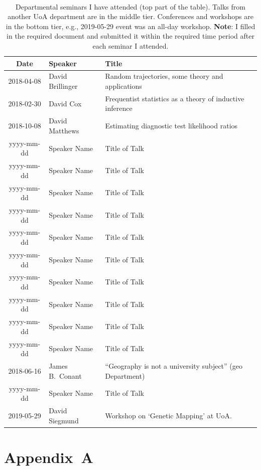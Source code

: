 \documentclass[12pt,a4paper]{article}
\begin{document}
\begin{table}[hh]
\caption{
Departmental seminars I have attended (top part of the table).
Talks from another UoA department are in the middle tier.
Conferences and workshops are in the bottom tier,
e.g., 2019-05-29 event was an all-day workshop.
\textbf{Note}:
I filled in the required document and submitted it
within the required time period after
each seminar I attended.
}
\centering
\ ~~~~ \\
\label{tab:seminars}
\begin{tabular}{|c|l|l|}
\hline
Date & Speaker & Title \\
\hline
2018-04-08 & David Brillinger &
Random trajectories, some theory and applications \\
%
2018-02-30 & David Cox &
Frequentist statistics as a theory of inductive inference \\
%
2018-10-08 & David Matthews &
Estimating diagnostic test likelihood ratios \\
%
yyyy-mm-dd & Speaker Name &
Title of Talk \\
%
yyyy-mm-dd & Speaker Name &
Title of Talk \\
%
yyyy-mm-dd & Speaker Name &
Title of Talk \\
%
yyyy-mm-dd & Speaker Name &
Title of Talk \\
%
yyyy-mm-dd & Speaker Name &
Title of Talk \\
%
yyyy-mm-dd & Speaker Name &
Title of Talk \\
%
yyyy-mm-dd & Speaker Name &
Title of Talk \\
%
yyyy-mm-dd & Speaker Name &
Title of Talk \\
%
yyyy-mm-dd & Speaker Name &
Title of Talk \\
%
yyyy-mm-dd & Speaker Name &
Title of Talk \\
%
\hline
2018-06-16 & James B.~Conant &
``Geography is not a university subject'' (geo Department) \\
%
yyyy-mm-dd & Speaker Name &
Title of Talk \\
\hline
2019-05-29 & David Siegmund &
Workshop on `Genetic Mapping' at UoA. \\
%
\hline
\end{tabular}
\end{table}








\section*{Appendix~A}
\end{document}
